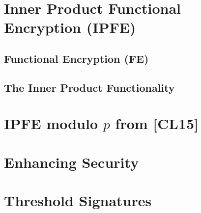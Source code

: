 \documentclass[10pt]{beamer}
\begin{document}
%

%

%

%


\section{Inner Product Functional Encryption (IPFE)}
\subsection{Functional Encryption (FE)}












\subsection{The Inner Product Functionality}





\section{IPFE modulo \texorpdfstring{$p$}{p} from [CL15]}








\section{Enhancing Security}



\section{Threshold Signatures}
\end{document}
